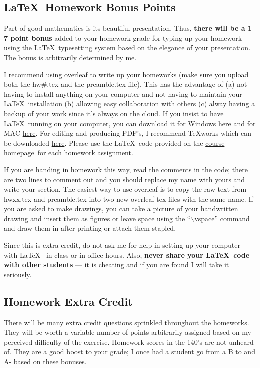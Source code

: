 \documentclass[12pt]{article}
\newcommand{\ingreen}[1]{\color{green}\textbf{#1} \color{black}}
\newcommand{\coursewebpage}{\href{https://github.com/kapelner/QC_Math_390.4_Spring_2019}{course homepage}}
\newcommand{\qu}[1]{``#1''}
\begin{document}
\subsection*{\LaTeX~Homework Bonus Points}

Part of good mathematics is its beautiful presentation. Thus, \ingreen{there will be a 1--7 point bonus} added to your homework grade  for typing up your homework using the \LaTeX ~typesetting system based on the elegance of your presentation. The bonus is arbitrarily determined by me.

I recommend using \href{http://overleaf.com}{overleaf} to write up your homeworks (make sure you upload both the hw\#.tex and the preamble.tex file). This has the advantage of (a) not having to install anything on your computer and not having to maintain your \LaTeX ~installation (b) allowing easy collaboration with others (c) alway having a backup of your work since it's always on the cloud. If you insist to have \LaTeX ~running on your computer, you can download it for Windows \href{http://www.miktex.org/download}{here} and for MAC \href{http://www.tug.org/mactex/}{here}. For editing and producing PDF's, I recommend \TeX works which can be downloaded \href{http://www.tug.org/texworks/#Getting_TeXworks}{here}. Please use the \LaTeX ~code provided on the \coursewebpage ~for each homework assignment. 

If you are handing in homework this way, read the comments in the code; there are two lines to comment out and you should replace my name with yours and write your section. The easiest way to use overleaf is to copy the raw text from hwxx.tex and preamble.tex into two new overleaf tex files with the same name. If you are asked to make drawings, you can take a picture of your handwritten drawing and insert them as figures or leave space using the \qu{$\backslash$vspace} command and draw them in after printing or attach them stapled.

Since this is extra credit, do not ask me for help in setting up your computer with \LaTeX~ in class or in office hours. Also, \textbf{never share your \LaTeX~code with other students} --- it is cheating and if you are found I will take it seriously.

\subsection*{Homework Extra Credit}

There will be many extra credit questions sprinkled throughout the homeworks. They will be worth a variable number of points arbitrarily assigned based on my perceived difficulty of the exercise. Homework scores in the 140's are not unheard of. They are a good boost to your grade; I once had a student go from a B to and A- based on these bonuses.
\end{document}
